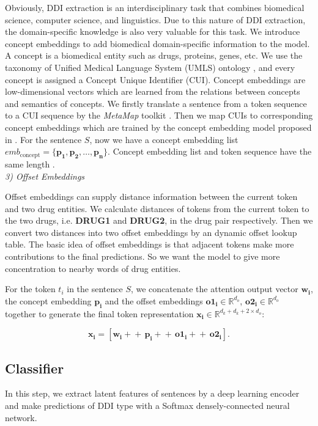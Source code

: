 \documentclass[conference]{IEEEtran}
\begin{document}
Obviously, DDI extraction is an interdisciplinary task that combines biomedical science, computer science, and linguistics.
Due to this nature of DDI extraction, the domain-specific knowledge is also very valuable for this task.
We introduce concept embeddings to add biomedical domain-specific information to the model.
A concept is a biomedical entity such as drugs, proteins, genes, etc.
We use the taxonomy of Unified Medical Language System (UMLS) ontology \cite{bodenreider_unified_2004},
and every concept is assigned a Concept Unique Identifier (CUI).
Concept embeddings are low-dimensional vectors which are learned from the relations between 
concepts and semantics of concepts.
We firstly translate a sentence from a token sequence to a CUI sequence by the \emph{MetaMap} toolkit \cite{aronson_overview_2010}.
Then we map CUIs to corresponding concept embeddings which are trained by the concept embedding model proposed in \cite{de_vine_medical_2014}.
For the sentence $S$, now we have a concept embedding list
$emb_{\text{concept}} = \{ \bm{p_1}, \bm{p_2}, \dots, \bm{p_n}\}$.
Concept embedding list and token sequence have the same length \cite{wang_ontology-based_2017}.\\

\emph{3) Offset Embeddings}

\bigbreak

Offset embeddings can supply distance information between the current token and two drug 
entities.
We calculate distances of tokens from the current token to the two drugs, i.e. \textbf{DRUG1} and \textbf{DRUG2}, in the drug pair respectively.
Then we convert two distances into two offset embeddings by an dynamic offset lookup table.
The basic idea of offset embeddings is that adjacent tokens make more contributions to the final predictions.
So we want the model to give more concentration to nearby words of drug entities.

For the token $t_i$ in the sentence $S$, we concatenate the attention output vector $\bm{w_i}$,
the concept embedding $\bm{p_i}$ and the offset embeddings $\bm{o1_i} \in \mathbb{R}^{d_o}$,
$\bm{o2_i} \in \mathbb{R}^{d_o}$ together to generate the final token representation $\bm{x_i} \in \mathbb{R}^{d_k + d_k + 2 \times d_o}$:

\begin{equation}
	\bm{x_i} = \left [ \bm{w_i} +\!\!\!\!+\, \bm{p_i} +\!\!\!\!+\, \bm{o1_i} +\!\!\!\!+\, \bm{o2_i} \right ].
\end{equation}

\subsection{Classifier}
In this step, we extract latent features of sentences by a deep learning encoder and make predictions of DDI type with a Softmax densely-connected neural network.
\end{document}
